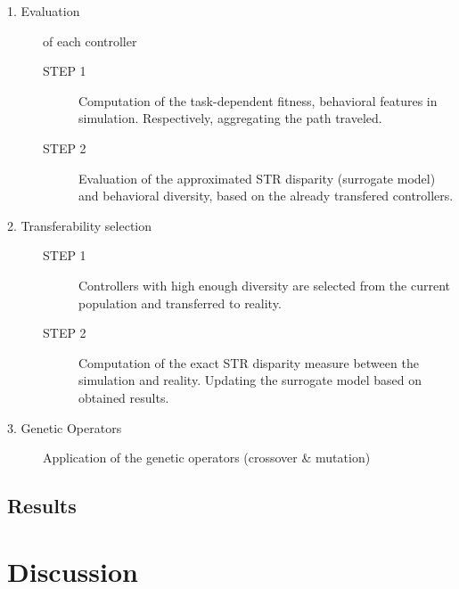 \begin{description}
	\item[1. Evaluation] of each controller
		\begin{description}
			\item[STEP 1] Computation of the task-dependent fitness, behavioral features in simulation. Respectively, aggregating the path traveled.
			\item[STEP 2] Evaluation of the approximated STR disparity (surrogate model) and behavioral diversity, based on the already transfered controllers.
		\end{description}
	\item[2. Transferability selection] 
		\begin{description}
			\item[STEP 1] Controllers with high enough diversity are selected from the current population and transferred to reality.
			\item[STEP 2] Computation of the exact STR disparity measure between the simulation and reality. Updating the surrogate model based on obtained results.
		\end{description}
	\item[3. Genetic Operators] Application of the genetic operators (crossover & mutation)
\end{description}


\subsection{Results}

\section{Discussion}



